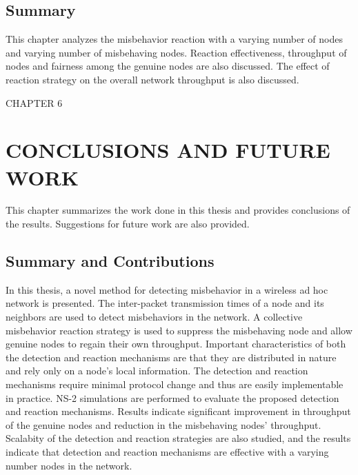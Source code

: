 \documentclass[12pt,letterpaper,english]{article}
\begin{document}
\subsection{Summary}
\label{summarysimulation}
\indent This chapter analyzes the misbehavior reaction with a varying number of nodes and varying number of misbehaving nodes. 
Reaction effectiveness, throughput of nodes and fairness among the genuine nodes are also discussed. 
The effect of reaction strategy on the overall network throughput is also discussed.
\newpage
\setcounter{figure}{0}
\setcounter{table}{0}
\setcounter{subsection}{0}
\begin{singlespace}
\begin{center}
CHAPTER 6
\section*{CONCLUSIONS AND FUTURE WORK}
\addtocounter{section}{1}
\label{chapter:conclusion}
\end{center}
\end{singlespace}
\indent This chapter summarizes the work done in this thesis and provides conclusions of the results. Suggestions for future work are also provided.
\subsection{Summary and Contributions}
\indent In this thesis, a novel method for detecting misbehavior in a wireless ad hoc network is presented.
The inter-packet transmission times of a node and its neighbors are used to detect misbehaviors in the network. 
A collective misbehavior reaction strategy is used to suppress the misbehaving node and allow genuine nodes to regain their own throughput. 
Important characteristics of both the detection and reaction mechanisms are that they are distributed in nature and rely only on a node's local information. The detection and reaction mechanisms require minimal protocol change and thus are easily implementable in practice.
NS-2 simulations are performed to evaluate the proposed detection and reaction mechanisms. Results indicate significant improvement in throughput of the genuine nodes and reduction in the misbehaving nodes' throughput. 
Scalabity of the detection and reaction strategies are also studied, and the results indicate that detection and reaction mechanisms are effective with a varying number nodes in the network. 
\end{document}

